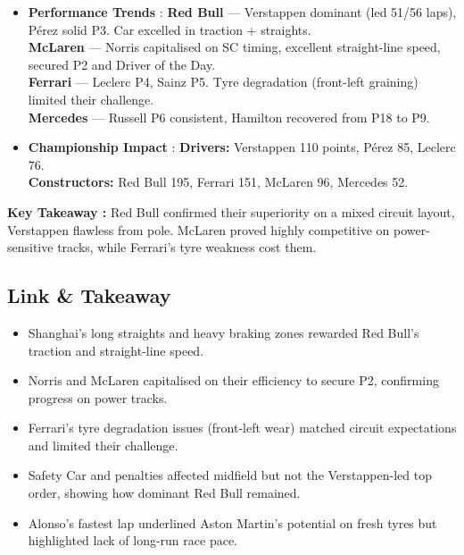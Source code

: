 \begin{itemize}
    \item \textbf{Performance Trends} : \textbf{Red Bull} — Verstappen dominant (led 51/56 laps), Pérez solid P3. Car excelled in traction + straights.\\
    \textbf{McLaren} — Norris capitalised on SC timing, excellent straight-line speed, secured P2 and Driver of the Day.\\
    \textbf{Ferrari} — Leclerc P4, Sainz P5. Tyre degradation (front-left graining) limited their challenge.\\
    \textbf{Mercedes} — Russell P6 consistent, Hamilton recovered from P18 to P9.

    \item \textbf{Championship Impact} : \textbf{Drivers:} Verstappen 110 points, Pérez 85, Leclerc 76.\\
    \textbf{Constructors:} Red Bull 195, Ferrari 151, McLaren 96, Mercedes 52.
\end{itemize}

\textbf{Key Takeaway :}  
Red Bull confirmed their superiority on a mixed circuit layout, Verstappen flawless from pole. McLaren proved highly competitive on power-sensitive tracks, while Ferrari’s tyre weakness cost them.

\subsection{Link \& Takeaway}

\begin{itemize}
    \item Shanghai’s long straights and heavy braking zones rewarded Red Bull’s traction and straight-line speed.
    \item Norris and McLaren capitalised on their efficiency to secure P2, confirming progress on power tracks.
    \item Ferrari’s tyre degradation issues (front-left wear) matched circuit expectations and limited their challenge.
    \item Safety Car and penalties affected midfield but not the Verstappen-led top order, showing how dominant Red Bull remained.
    \item Alonso’s fastest lap underlined Aston Martin’s potential on fresh tyres but highlighted lack of long-run race pace.
\end{itemize}
